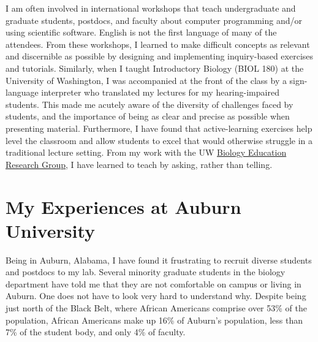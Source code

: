 I am often involved in international workshops that teach undergraduate and
graduate students, postdocs, and faculty about computer programming and/or
using scientific software.
English is not the first language of many of the attendees.
From these workshops, I learned to make difficult concepts as relevant and
discernible as possible by designing and implementing inquiry-based exercises
and tutorials.
Similarly, when I taught Introductory Biology (BIOL 180) at the University of
Washington, I was accompanied at the front of the class by a sign-language
interpreter who translated my lectures for my hearing-impaired students.
This made me acutely aware of the diversity of challenges faced by
students, and the importance of being as clear and precise as possible when
presenting material.
Furthermore, I have found that active-learning exercises help level the
classroom and allow students to excel that would otherwise struggle in a
traditional lecture setting.
From my work with the UW
\href{https://sites.google.com/site/uwbioedresgroup/home}{Biology Education
    Research Group}, I have learned to teach by asking, rather than telling.


\section*{My Experiences at Auburn University}
Being in Auburn, Alabama, I have found it frustrating to recruit diverse
students and postdocs to my lab.
Several minority graduate students in the biology department have told me that
they are not comfortable on campus or living in Auburn.
One does not have to look very hard to understand why.
Despite being just north of the Black Belt,
where African Americans comprise over 53\% of the population,
African Americans make up
16\% of Auburn's population, less than 7\% of the student body,
and only 4\% of faculty.

